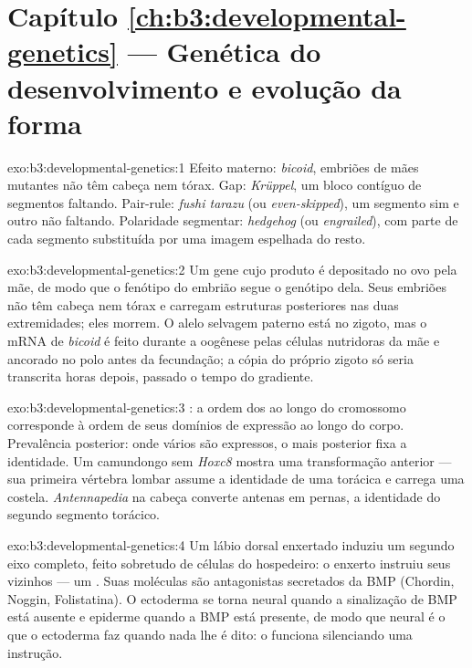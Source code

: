 \section*{Capítulo \ref{ch:b3:developmental-genetics} --- Genética do desenvolvimento e evolução da forma}

\begin{solution}{exo:b3:developmental-genetics:1}
Efeito materno: \emph{bicoid}, embriões de mães mutantes não têm cabeça
nem tórax. Gap: \emph{Krüppel}, um bloco contíguo de segmentos faltando.
Pair-rule: \emph{fushi tarazu} (ou \emph{even-skipped}), um segmento sim
e outro não faltando. Polaridade segmentar: \emph{hedgehog} (ou
\emph{engrailed}), com parte de cada segmento substituída por uma imagem
espelhada do resto.
\end{solution}

\begin{solution}{exo:b3:developmental-genetics:2}
Um gene cujo produto é depositado no ovo pela mãe, de modo que o
fenótipo do embrião segue o genótipo dela. Seus embriões não têm cabeça
nem tórax e carregam estruturas posteriores nas duas extremidades; eles
morrem. O alelo selvagem paterno está no zigoto, mas o mRNA de
\emph{bicoid} é feito durante a oogênese pelas células nutridoras da mãe
e ancorado no polo antes da fecundação; a cópia do próprio zigoto só
seria transcrita horas depois, passado o tempo do gradiente.
\end{solution}

\begin{solution}{exo:b3:developmental-genetics:3}
: a ordem dos  ao longo do cromossomo corresponde
à ordem de seus domínios de expressão ao longo do corpo. Prevalência
posterior: onde vários são expressos, o mais posterior fixa a
identidade. Um camundongo sem \emph{Hoxc8} mostra uma transformação
anterior --- sua primeira vértebra lombar assume a identidade de uma
torácica e carrega uma costela. \emph{Antennapedia} na cabeça converte
antenas em pernas, a identidade do segundo segmento torácico.
\end{solution}

\begin{solution}{exo:b3:developmental-genetics:4}
Um lábio dorsal enxertado induziu um segundo eixo completo, feito
sobretudo de células do hospedeiro: o enxerto instruiu seus vizinhos ---
um . Suas moléculas são antagonistas secretados da BMP
(Chordin, Noggin, Folistatina). O ectoderma se torna neural quando a
sinalização de BMP está ausente e epiderme quando a BMP está presente, de
modo que neural é o que o ectoderma faz quando nada lhe é dito: o
 funciona silenciando uma instrução.
\end{solution}

